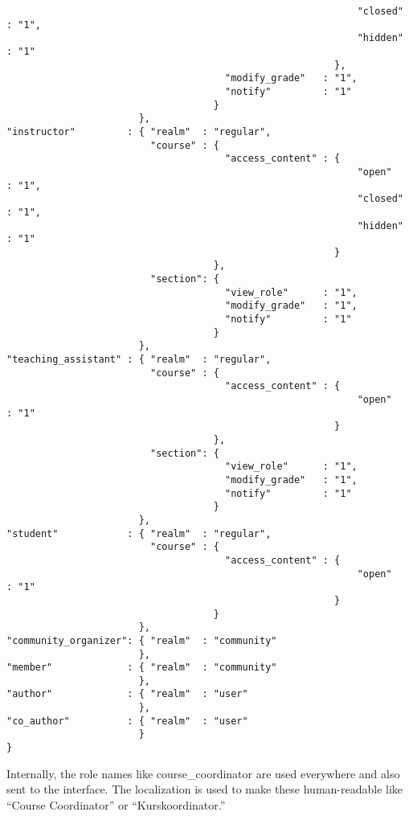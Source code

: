 \begin{verbatim}
                                                             "closed"             : "1",
                                                             "hidden"             : "1"
                                                         },
                                      "modify_grade"   : "1",
                                      "notify"         : "1"
                                    }
                       },
"instructor"         : { "realm"  : "regular",
                         "course" : { 
                                      "access_content" : {
                                                             "open"               : "1",
                                                             "closed"             : "1",
                                                             "hidden"             : "1"
                                                         }
                                    },
                         "section": {
                                      "view_role"      : "1",
                                      "modify_grade"   : "1",
                                      "notify"         : "1"
                                    }
                       },
"teaching_assistant" : { "realm"  : "regular",
                         "course" : { 
                                      "access_content" : {
                                                             "open"               : "1"
                                                         }
                                    },
                         "section": {
                                      "view_role"      : "1",
                                      "modify_grade"   : "1",
                                      "notify"         : "1"
                                    }
                       },
"student"            : { "realm"  : "regular",
                         "course" : {
                                      "access_content" : {
                                                             "open"               : "1"
                                                         }
                                    }
                       },
"community_organizer": { "realm"  : "community"
                       },
"member"             : { "realm"  : "community"
                       },
"author"             : { "realm"  : "user"
                       },
"co_author"          : { "realm"  : "user"
                       }
}

\end{verbatim}
Internally, the role names like course\_coordinator are used everywhere and also sent to the interface. The localization is used to make these human-readable like ``Course Coordinator'' or ``Kurskoordinator.''
